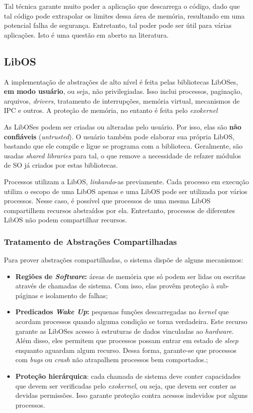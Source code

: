 Tal técnica garante muito poder a aplicação que descarrega o código, dado que tal código pode extrapolar os limites dessa área de memória, resultando em uma potencial falha de segurança. Entretanto, tal poder pode ser útil para várias aplicações. Isto é uma questão em aberto na literatura.


\subsection{LibOS}
A implementação de abstrações de alto nível é feita pelas bibliotecas LibOSes, \textbf{em modo usuário}, ou seja, não privilegiadas. Isso inclui processos, paginação, arquivos, \textit{drivers}, tratamento de interrupções, memória virtual, mecanismos de IPC e outros. A proteção de memória, no entanto é feita pelo \textit{exokernel}

As LibOSes podem ser criadas ou alteradas pelo usuário. Por isso, elas são \textbf{não confiáveis} (\textit{untrusted}). O usuário também pode elaborar sua própria LibOS, bastando que ele compile e ligue se programa com a biblioteca. Geralmente, são usadas \textit{shared libraries} para tal, o que remove a necessidade de refazer módulos de SO já criados por estas bibliotecas.

Processos utilizam a LibOS, \textit{linkando}-as previamente. Cada processo em execução utiliza o escopo de uma LibOS apenas e uma LibOS pode ser utilizada por vários processos. Nesse caso, é possível que processos de uma mesma LibOS compartilhem recursos abstraídos por ela. Entretanto, processos de diferentes LibOS não podem compartilhar recursos.

\subsubsection{Tratamento de Abstrações Compartilhadas}
Para prover abstrações compartilhadas, o sistema dispõe de alguns mecanismos:

\begin{itemize}
  \item \textbf{Regiões de \textit{Software}:} áreas de memória que só podem ser lidas ou escritas através de chamadas de sistema. Com isso, elas provêm proteção à sub-páginas e isolamento de falhas;

  \item \textbf{Predicados \textit{Wake Up}:} pequenas funções descarregadas no \textit{kernel} que acordam processos quando alguma condição se torna verdadeira. Este recurso garante as LibOSes acesso à estruturas de dados vinculadas ao \textit{hardware}. Além disso, eles permitem que processos possam entrar em estado de \textit{sleep} enquanto aguardam algum recurso. Dessa forma, garante-se que processos com \textit{bugs} ou \textit{crash} não atrapalhem processos bem comportados.;

  \item \textbf{Proteção hierárquica}: cada chamada de sistema deve conter capacidades que devem ser verificadas pelo \textit{exokernel}, ou seja, que devem ser conter as devidas permissões. Isso garante proteção contra acessos indevidos por alguns processos.
\end{itemize}

